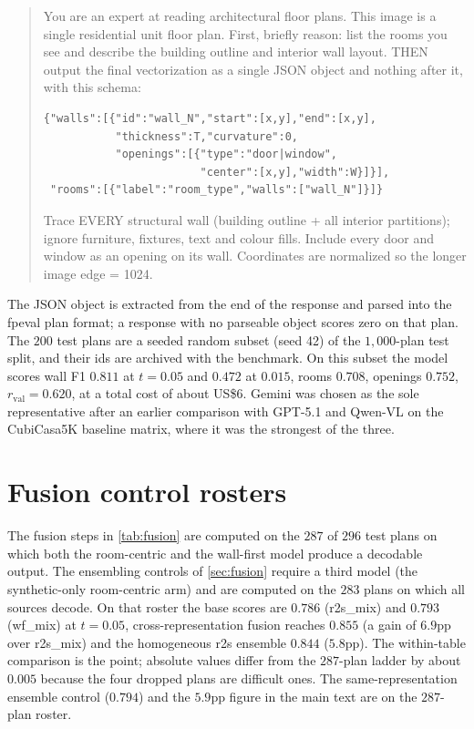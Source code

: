 \documentclass{article}
\begin{document}
\begin{quote}\small
You are an expert at reading architectural floor plans. This image is a
single residential unit floor plan. First, briefly reason: list the rooms
you see and describe the building outline and interior wall layout. THEN
output the final vectorization as a single JSON object and nothing after
it, with this schema:
\begin{verbatim}
{"walls":[{"id":"wall_N","start":[x,y],"end":[x,y],
           "thickness":T,"curvature":0,
           "openings":[{"type":"door|window",
                        "center":[x,y],"width":W}]}],
 "rooms":[{"label":"room_type","walls":["wall_N"]}]}
\end{verbatim}
Trace EVERY structural wall (building outline + all interior partitions);
ignore furniture, fixtures, text and colour fills. Include every door and
window as an opening on its wall. Coordinates are normalized so the longer
image edge = 1024.
\end{quote}

The JSON object is extracted from the end of the response and parsed into the
fpeval plan format; a response with no parseable object scores zero on that
plan. The $200$ test plans are a seeded random subset (seed 42) of the
$1{,}000$-plan test split, and their ids are archived with the benchmark. On
this subset the model scores wall F1 $0.811$ at $t=0.05$ and $0.472$ at
$0.015$, rooms $0.708$, openings $0.752$, $r_{\mathrm{val}}=0.620$, at a
total cost of about US\$6. Gemini was chosen as the sole representative
after an earlier comparison with GPT-5.1 and Qwen-VL on the CubiCasa5K
baseline matrix, where it was the strongest of the three.

\section{Fusion control rosters}\label{app:rosters}
The fusion steps in \cref{tab:fusion} are computed on the $287$ of $296$
test plans on which both the room-centric and the wall-first model produce a
decodable output. The ensembling controls of \cref{sec:fusion} require a
third model (the synthetic-only room-centric arm) and are computed on the
$283$ plans on which all sources decode. On that roster the base scores are
$0.786$ (r2s\_mix) and $0.793$ (wf\_mix) at $t=0.05$, cross-representation
fusion reaches $0.855$ (a gain of $6.9$pp over r2s\_mix) and the homogeneous
r2s ensemble $0.844$ ($5.8$pp). The within-table comparison is the point;
absolute values differ from the $287$-plan ladder by about $0.005$ because
the four dropped plans are difficult ones. The same-representation ensemble
control ($0.794$) and the $5.9$pp figure in the main text are on the
$287$-plan roster.



\end{document}
